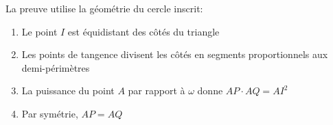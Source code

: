 \documentclass[11pt,%
	fleqn,%
	a4paper,%
	twoside%
]{backagBook}
\begin{document}
\begin{solution}
La preuve utilise la géométrie du cercle inscrit:
\begin{enumerate}
    \item Le point $I$ est équidistant des côtés du triangle
    \item Les points de tangence divisent les côtés en segments proportionnels aux demi-périmètres
    \item La puissance du point $A$ par rapport à $\omega$ donne $AP \cdot AQ = AI^2$
    \item Par symétrie, $AP = AQ$
\end{enumerate}
\end{solution}


\printbibliography[heading=bibintoc]
\printindex
\end{document}
